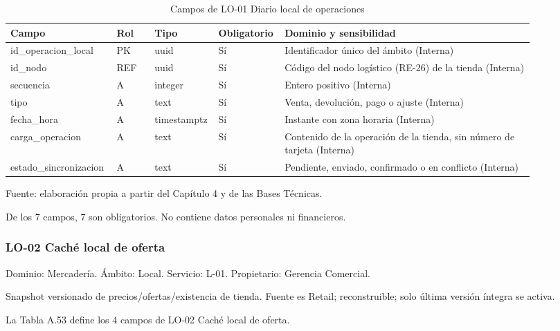 \documentclass[11pt]{article}
\begin{document}
\begin{table}[htbp]
\caption{Campos de LO-01 Diario local de operaciones}\label{tab:d_lo01}
\centering
\begin{tabular}{@{}p{0.167\linewidth}p{0.070\linewidth}p{0.079\linewidth}p{0.097\linewidth}p{0.465\linewidth}@{}}
\toprule Campo & Rol & Tipo & Obligatorio & Dominio y sensibilidad \\
\midrule
id\_operacion\_local & PK & uuid & Sí & Identificador único del ámbito (Interna) \\
id\_nodo & REF & uuid & Sí & Código del nodo logístico (RE-26) de la tienda (Interna) \\
secuencia & A & integer & Sí & Entero positivo (Interna) \\
tipo & A & text & Sí & Venta, devolución, pago o ajuste (Interna) \\
fecha\_hora & A & timestamptz & Sí & Instante con zona horaria (Interna) \\
carga\_operacion & A & text & Sí & Contenido de la operación de la tienda, sin número de tarjeta (Interna) \\
estado\_sincronizacion & A & text & Sí & Pendiente, enviado, confirmado o en conflicto (Interna) \\
\bottomrule
\end{tabular}
\par\smallskip
{\raggedright Fuente: elaboración propia a partir del Capítulo 4 y de las Bases Técnicas.\par}
\end{table}


De los 7 campos, 7 son obligatorios. No contiene datos personales ni financieros.

\subsubsection{LO-02 Caché local de oferta}

Dominio: Mercadería. Ámbito: Local. Servicio: L-01. Propietario: Gerencia Comercial.

Snapshot versionado de precios/ofertas/existencia de tienda. Fuente es Retail; reconstruible; solo última versión íntegra se activa.

La Tabla A.53 define los 4 campos de LO-02 Caché local de oferta.
\end{document}
